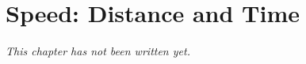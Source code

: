 \chapter{Speed: Distance and Time}\label{ch:g5:speed-distance-time}


\emph{This chapter has not been written yet.}

